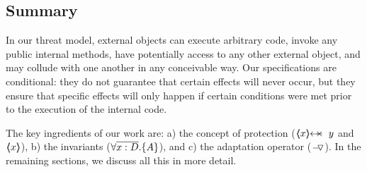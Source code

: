 \subsection*{Summary}

In our threat model, external objects can execute arbitrary code, invoke any public internal methods, have potentially access to any other external object, and may collude with one another  in any conceivable way.
Our specifications are conditional: they do not guarantee that certain effects will never occur, but they ensure that specific effects will only happen if certain conditions were met prior to the execution of the internal code.
 
The key ingredients of our work are: a) the concept of protection ($\protectedFrom {x} {y}$ and $\langle\!\!\langle x \rangle\!\!\rangle$), b) the \scoped invariants (${\forall {\overline {x:D}}.{{\{}}{A}{{\}}}}$), and c) the adaptation operator ($ { } \!-\!\!\!\,\!{\triangledown} { } $).
In the remaining sections, we discuss all this in more detail.

 

 

 
 